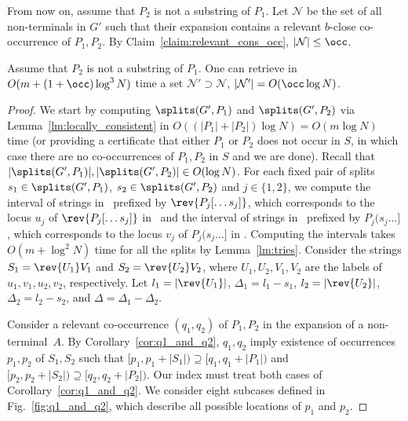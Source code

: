 From now on, assume that $P_2$ is not a substring of $P_1$. Let $\mathcal{N}$ be the set of all non-terminals in $G'$ such that their expansion contains a relevant $b$-close co-occurrence of $P_1, P_2$. By Claim~\ref{claim:relevant_cons_occ}, $|\mathcal{N}| \le \occ$. 

\begin{lemma}\label{lm:non-term_close_co_occ}
Assume that $P_2$ is not a substring of $P_1$. One can retrieve in $O(m+(1+\occ)\log^3 N)$ time a set $\mathcal{N}' \supset \mathcal{N}$, $|\mathcal{N}'| = O(\occ \log N)$. 
\end{lemma}
\begin{proof}
We start by computing $\splits(G',P_1)$ and $\splits(G',P_2)$ via Lemma~\ref{lm:locally_consistent} in $O((|P_1|+|P_2|) \log N) = O(m \log N)$ time (or providing a certificate that either $P_1$ or $P_2$ does not occur in $S$, in which case there are no co-occurrences of $P_1,P_2$ in $S$ and we are done). Recall that $|\splits(G',P_1)|, |\splits(G',P_2)| \in O(\log N)$. For each fixed pair of splits $s_1 \in \splits (G',P_1)$, $s_2 \in \splits (G',P_2)$ and $j \in \{1,2\}$, we compute the interval of strings in \Tpre\ prefixed by $\rev{P_j[\dots s_j]}$, which corresponds to the locus $u_j$ of $\rev{P_j[\dots s_j]}$ in \Tpre\, and the interval of strings in \Tsuf\ prefixed by $P_j(s_j \dots ]$, which corresponds to the locus $v_j$ of $P_j(s_j \dots ]$ in \Tsuf. Computing the intervals takes $O(m+\log^2 N)$ time for all the splits by Lemma~\ref{lm:tries}. Consider the strings $S_1=\rev{U_1}V_1$ and $S_2=\rev{U_2}V_2$, where $U_1, U_2, V_1, V_2$ are the labels of $u_1, v_1, u_2, v_2$, respectively. Let $l_1 = |\rev{U_1}|$, $\Delta_1 = l_1-s_1$, $l_2 = |\rev{U_2}|$, $\Delta_2 = l_2-s_2$, and $\Delta = \Delta_1-\Delta_2$. 

Consider a relevant co-occurrence $(q_1,q_2)$ of $P_1,P_2$ in the expansion of a non-terminal~$A$. By Corollary~\ref{cor:q1_and_q2}, $q_1,q_2$ imply existence of occurrences $p_1,p_2$ of $S_1,S_2$ such that $[p_1,p_1+|S_1|) \supseteq [q_1,q_1+|P_1|)$ and $[p_2,p_2+|S_2|) \supseteq [q_2,q_2+|P_2|)$. 
Our index must treat both cases of Corollary~\ref{cor:q1_and_q2}. We consider eight subcases defined in Fig.~\ref{fig:q1_and_q2}, which describe all possible locations of $p_1$ and $p_2$. 




\end{proof}
